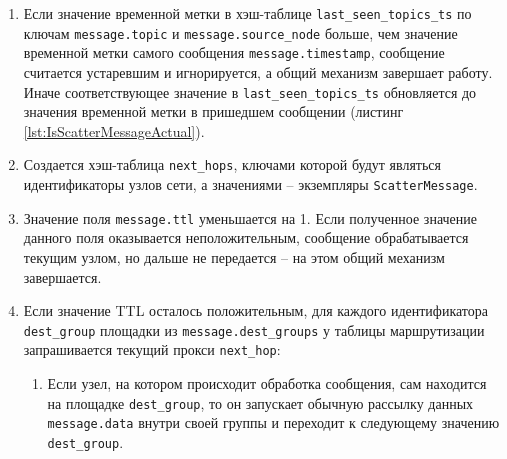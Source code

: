 \documentclass{article}
\theoremstyle{plain}
\theoremstyle{plain}
\theoremstyle{plain}
\theoremstyle{plain}
\theoremstyle{definition}
\theoremstyle{remark}
\theoremstyle{plain}
\begin{document}
\begin{enumerate}
    \item Если значение временной метки в хэш-таблице \texttt{last\_seen\_topics\_ts} по ключам \texttt{message.topic} и \texttt{message.source\_node} больше, чем значение временной метки самого сообщения \texttt{message.timestamp}, сообщение считается устаревшим и игнорируется, а общий механизм завершает работу. Иначе соответствующее значение в \texttt{last\_seen\_topics\_ts} обновляется до значения временной метки в пришедшем сообщении (листинг \ref{lst:IsScatterMessageActual}).


    \item Создается хэш-таблица \texttt{next\_hops}, ключами которой будут являться идентификаторы узлов сети, а значениями -- экземпляры \texttt{ScatterMessage}.
    
    \item Значение поля \texttt{message.ttl} уменьшается на 1. Если полученное значение данного поля оказывается неположительным, сообщение обрабатывается текущим узлом, но дальше не передается -- на этом общий механизм завершается.
    
    \item Если значение TTL осталось положительным, для каждого идентификатора \\
    \texttt{dest\_group} площадки из \texttt{message.dest\_groups} у таблицы маршрутизации запрашивается текущий прокси \texttt{next\_hop}:
    
    \begin{enumerate}
        \item Если узел, на котором происходит обработка сообщения, сам находится на площадке \texttt{dest\_group}, то он запускает обычную рассылку данных \texttt{message.data} внутри своей группы и переходит к следующему значению \texttt{dest\_group}.
    

\end{enumerate}
\end{enumerate}
\end{document}
